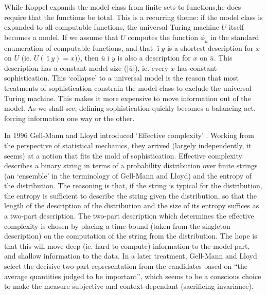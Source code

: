 \documentclass{style/llncs}
\newcommand{\br}[1]{\overline{#1}}
\begin{document}
While Koppel expands the model class from finite sets to functions,he does require that the functions be total. This is a recurring theme: if the model class is expanded to all computable functions, the universal Turing machine $U$ itself becomes a model. If we assume that $U$ computes the function $\phi_u$ in the standard enumeration of computable functions, and that $\bar\imath y$ is a shortest description for $x$ on $U$ (ie. $U(\bar\imath y) = x)$), then $\br{u}\br{\imath}y$ is also a description for $x$ on $\bar u$. This description has a constant model size ($|\br{u}|$), ie. every $x$ has constant sophistication. This `collapse' to a universal model is the reason that most treatments of sophistication constrain the model class to exclude the universal Turing machine. This makes it more expensive to move information out of the model. As we shall see, defining sophistication quickly becomes a balancing act, forcing information one way or the other.

In 1996 Gell-Mann and Lloyd introduced `Effective complexity' \cite{gellmann1996information}. Working from the perspective of statistical mechanics, they arrived (largely independently, it seems) at a notion that fits the mold of sophistication. Effective complexity describes a binary string in terms of a probability distribution over finite strings (an `ensemble' in the terminology of Gell-Mann and Lloyd) and the entropy of the distribution. The reasoning is that, if the string is typical for the distribution, the entropy is sufficient to describe the string given the distribution, so that the length of the description of the distribution and the size of its entropy suffices as a two-part description. The two-part description which determines the effective complexity is chosen by placing a time bound (taken from the singleton description) on the computation of the string from the distribution. The hope is that this will move deep (ie. hard to compute) information to the model part, and shallow information to the data. In a later treatment\cite{gell2004nonextensive}, Gell-Mann and Lloyd select the decisive two-part representation from the candidates based on ``the average quantities judged to be important'', which seems to be a conscious choice to make the measure subjective and context-dependant (sacrificing invariance).
\end{document}
